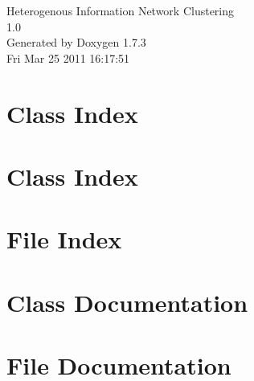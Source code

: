 \documentclass[a4paper]{book}
\begin{document}
\hypersetup{pageanchor=false}
\begin{titlepage}
\vspace*{7cm}
\begin{center}
{\Large Heterogenous Information Network Clustering \\[1ex]\large 1.0 }\\
\vspace*{1cm}
{\large Generated by Doxygen 1.7.3}\\
\vspace*{0.5cm}
{\small Fri Mar 25 2011 16:17:51}\\
\end{center}
\end{titlepage}
\clearemptydoublepage
{}
\tableofcontents
\clearemptydoublepage
{}
\hypersetup{pageanchor=true}
\chapter{Class Index}

\chapter{Class Index}

\chapter{File Index}

\chapter{Class Documentation}







\chapter{File Documentation}





























\printindex
\end{document}
